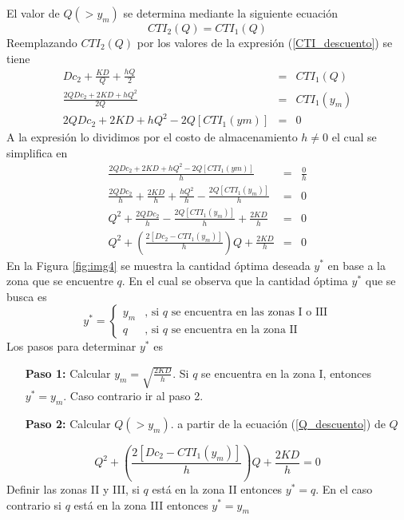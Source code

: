 El valor de $Q (> y_m)$ se determina mediante la siguiente ecuación
$$
CTI_2 (Q) = CTI_1 (Q)
$$
Reemplazando $CTI_2 (Q)$ por los valores de la expresión (\ref{CTI_descuento}) se tiene
\begin{eqnarray}
	Dc_2 + \frac{KD}{Q} + \frac{hQ}{2} &=& CTI_1 (Q) \nonumber \\
	\frac{2QDc_2 + 2KD + hQ^2}{2Q} &=& CTI_1 (y_m) \nonumber \\
	2QDc_2 + 2KD + hQ^2 - 2Q [ CTI_1 (ym) ] &=& 0 \nonumber
\end{eqnarray}
A la expresión lo dividimos por el costo de almacenamiento $h \neq 0$ el cual se simplifica en
\begin{eqnarray}
	\label{Q_descuento}
	\frac{2QDc_2 + 2KD + hQ^2 - 2Q [ CTI_1 (ym) ]}{h} &=& \frac{0}{h} \nonumber \\
	\frac{2QDc_2}{h} + \frac{2KD}{h} + \frac{hQ^2}{h} - \frac{2Q [ CTI_1 (y_m) ]}{h} &=& 0 \nonumber \\
	Q^2 + \frac{2QDc_2}{h} - \frac{2Q [ CTI_1 (y_m) ]}{h} + \frac{2KD}{h} &=& 0 \nonumber \\
	Q^2 + \left( \frac{2[ Dc_2 - CTI_1 (y_m) ]}{h} \right) Q + \frac{2KD}{h} &=& 0 
\end{eqnarray}
En la Figura \ref{fig:img4} se muestra la cantidad óptima deseada $y^*$ en base a la zona que se encuentre $q$.
En el cual se observa que la cantidad óptima $y^*$ que se busca es
\begin{equation}
	\label{CTI_descuento2}
	y^* = \left\{%
	\begin{array}{ll}
		y_m & \text{, si } q \text{ se encuentra en las zonas I o III} \\ 
		q & \text{, si } q \text{ se encuentra en la zona II}
	\end{array}%
	\right.
\end{equation}
Los pasos para determinar $y^*$ es
\begin{itemize}
	\item[\textbf{Paso 1:}] Calcular $y_m = \sqrt{\frac{2KD}{h}}$. Si $q$ se encuentra en la zona I, entonces $y^* = y_m$. Caso contrario ir al paso 2.
	\item[\textbf{Paso 2:}] Calcular $Q (> y_m)$. a partir de la ecuación (\ref{Q_descuento}) de $Q$
\end{itemize}
$$
	Q^2 + \left( \frac{2[ Dc_2 - CTI_1 (y_m) ]}{h} \right) Q + \frac{2KD}{h} = 0 
$$
Definir las zonas II y III, si $q$ está en la zona II entonces $y^* = q$. En el caso contrario si $q$ está en la zona III entonces $y^* = y_m$

